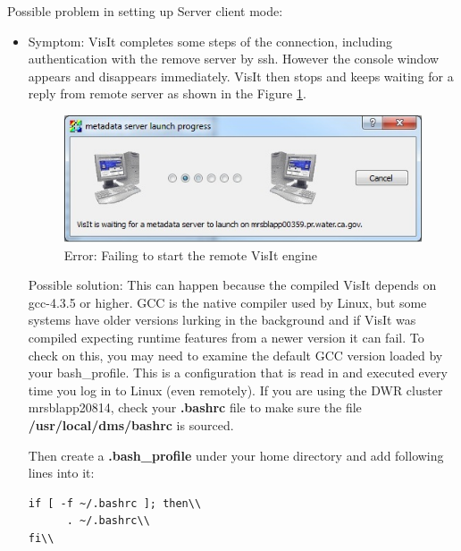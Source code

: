\documentclass[12pt]{report}
\begin{document}
   Possible problem in setting up Server client mode:

   \begin{itemize}

    \item Symptom: VisIt completes some steps of the connection, including authentication with the remove server by ssh. However the console window appears and disappears immediately. VisIt then stops and keeps waiting for a reply from remote server as shown in the Figure \ref{figure:failToStart}.

        \begin{figure}
        \begin{center}
        \includegraphics{failToStart}
        \caption{Error: Failing to start the remote VisIt engine}
        \label{figure:failToStart}
        \end{center}
        \end{figure}

Possible solution: This can happen because the compiled VisIt depends on gcc-4.3.5 or higher. GCC is the native compiler 
used by Linux, but some systems have older versions lurking in the background and if VisIt was compiled expecting runtime
features from a newer version it can fail. To check on this, you may need to examine the default GCC version loaded by your
bash\_profile. This is a configuration that is read in and executed every time you log in to Linux (even remotely). 
If you are using the DWR cluster mrsblapp20814, check your {\bf .bashrc} file to make sure the file {\bf /usr/local/dms/bashrc} is sourced. 

Then create a {\bf .bash\_profile} under your home directory and add following lines into it:\\

\begin{verbatim}
if [ -f ~/.bashrc ]; then\\
      . ~/.bashrc\\
fi\\
\end{verbatim} 
\end{itemize}
\end{document}
